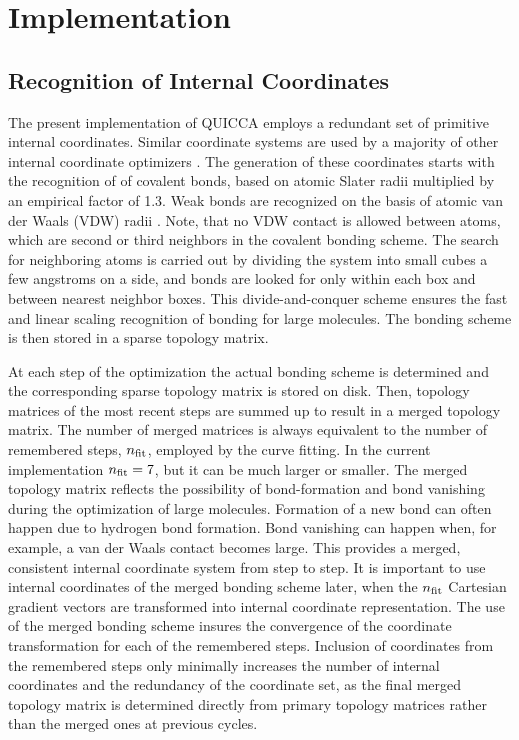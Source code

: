 \documentclass[prl,twocolumn,showpacs,twocolumngrid,superbib]{revtex4}
\begin{document}
\section{Implementation}

\subsection{Recognition of Internal Coordinates}

The present implementation of QUICCA employs a redundant set of primitive internal 
coordinates. Similar coordinate systems are used by a majority of other internal coordinate optimizers 
\cite{bakerstest,eckert,Pulay_natural_internals,fogarasi_diaghess,schlegel_on2iter}.  
The generation of these coordinates starts with the recognition of of covalent bonds, 
based on atomic Slater radii \cite{SlaterRad}  multiplied by an empirical factor of 1.3. 
Weak bonds are recognized on the basis of atomic van der Waals (VDW) radii \cite{JMOLtable}.
Note, that no VDW contact is allowed between atoms, which are second or third neighbors in the 
covalent bonding scheme.  The search for neighboring atoms is carried out by dividing 
the system into small cubes a few angstroms on a side, and bonds are looked for only within 
each box and between nearest neighbor boxes.  This divide-and-conquer scheme ensures the fast 
and linear scaling recognition of bonding for large molecules. The bonding scheme is then 
stored in a sparse topology matrix.

At each step of the optimization the actual bonding scheme is determined and the corresponding 
sparse topology matrix is stored on disk.  Then, topology matrices of the most recent steps are 
summed up to result in a merged topology matrix.  The number of merged matrices is always equivalent 
to the number of remembered steps, $n_{\rm fit}$, employed by the curve fitting. In the current implementation 
$n_{\rm fit}=7$, but it can be much larger or smaller.  The merged topology matrix reflects the possibility of 
bond-formation and bond vanishing during the optimization of large molecules.  Formation of a new 
bond can often happen due to hydrogen bond formation. Bond vanishing can happen when, for example,
a van der Waals contact becomes large.  This provides a merged, consistent internal coordinate 
system from step to step.  It is important to use internal coordinates
of the merged bonding scheme later, when the $n_{\rm fit}$ Cartesian gradient
vectors are transformed into internal coordinate representation. The use of the merged bonding 
scheme insures the convergence of the coordinate transformation for each of the remembered steps.
Inclusion of coordinates from the remembered steps only minimally increases the number of internal 
coordinates and the redundancy of the coordinate set, as the final merged topology matrix is 
determined directly from primary topology matrices rather than the merged ones at previous cycles.
\end{document}
